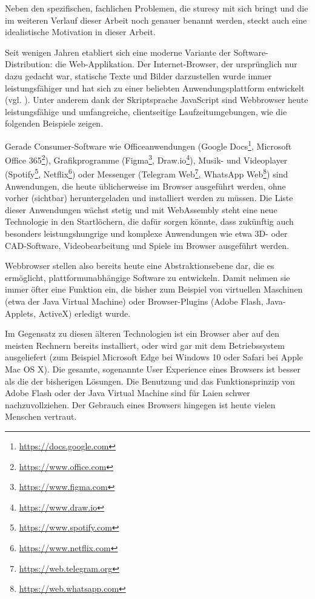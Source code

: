 Neben den spezifischen, fachlichen Problemen, die \ac{sturesy} mit sich bringt und die im weiteren Verlauf dieser Arbeit noch genauer benannt werden, steckt auch eine idealistische Motivation in dieser Arbeit.

Seit wenigen Jahren etabliert sich eine moderne Variante der Software-Distribution: die Web-Applikation. Der Internet-Browser, der ursprünglich nur dazu gedacht war, statische Texte und Bilder darzustellen wurde immer leistungsfähiger und hat sich zu einer beliebten Anwendungsplattform entwickelt (vgl. \cite[S. 1]{art:web1to4}). Unter anderem dank der Skriptsprache JavaScript sind Webbrowser heute leistungsfähige und umfangreiche, clientseitige Laufzeitumgebungen, wie die folgenden Beispiele zeigen.

Gerade Consumer-Software wie Officeanwendungen (Google Docs\footnote{\url{https://docs.google.com}}, Microsoft Office 365\footnote{\url{https://www.office.com}}), Grafikprogramme (Figma\footnote{\url{https://www.figma.com}}, Draw.io\footnote{\url{https://www.draw.io}}), Musik- und Videoplayer (Spotify\footnote{\url{https://www.spotify.com}}, Netflix\footnote{\url{https://www.netflix.com}}) oder Messenger (Telegram Web\footnote{\url{https://web.telegram.org}}, WhatsApp Web\footnote{\url{https://web.whatsapp.com}}) sind Anwendungen, die heute üblicherweise im Browser ausgeführt werden, ohne vorher (sichtbar) heruntergeladen und installiert werden zu müssen. Die Liste dieser Anwendungen wächst stetig und mit WebAssembly steht eine neue Technologie in den Startlöchern, die dafür sorgen könnte, dass zukünftig auch besonders leistungshungrige und komplexe Anwendungen wie etwa 3D- oder CAD-Software, Videobearbeitung und Spiele im Browser ausgeführt werden.

Webbrowser stellen also bereits heute eine Abstraktionsebene dar, die es ermöglicht, plattformunabhängige Software zu entwickeln. Damit nehmen sie immer öfter eine Funktion ein, die bisher zum Beispiel von virtuellen Maschinen (etwa der Java Virtual Machine) oder Browser-Plugins (Adobe Flash, Java-Applets, ActiveX) erledigt wurde.

Im Gegensatz zu diesen älteren Technologien ist ein Browser aber auf den meisten Rechnern bereits installiert, oder wird gar mit dem Betriebssystem ausgeliefert (zum Beispiel Microsoft Edge bei Windows 10 oder Safari bei Apple Mac OS X). Die gesamte, sogenannte User Experience eines Browsers ist besser als die der bisherigen Lösungen.
Die Benutzung und das Funktionsprinzip von Adobe Flash oder der Java Virtual Machine sind für Laien schwer nachzuvollziehen. Der Gebrauch eines Browsers hingegen ist heute vielen Menschen vertraut.


